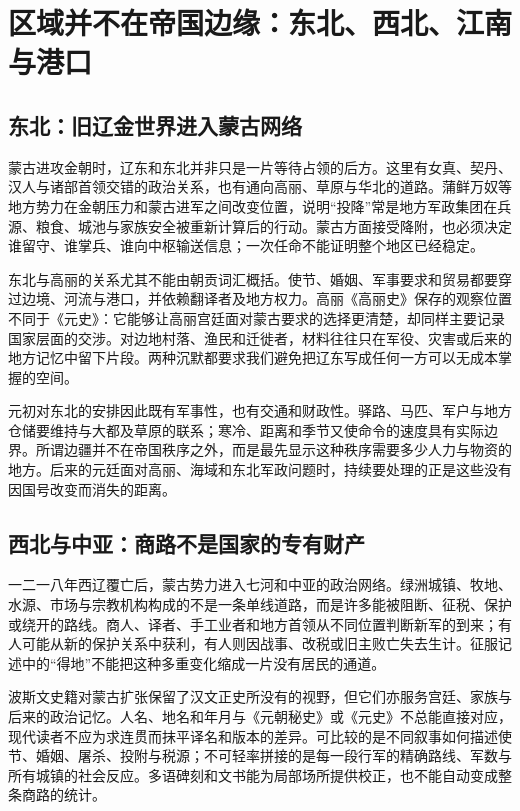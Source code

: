 \section{区域并不在帝国边缘：东北、西北、江南与港口}

\subsection{东北：旧辽金世界进入蒙古网络}

蒙古进攻金朝时，辽东和东北并非只是一片等待占领的后方。这里有女真、契丹、汉人与诸部首领交错的政治关系，也有通向高丽、草原与华北的道路。蒲鲜万奴等地方势力在金朝压力和蒙古进军之间改变位置，说明“投降”常是地方军政集团在兵源、粮食、城池与家族安全被重新计算后的行动。蒙古方面接受降附，也必须决定谁留守、谁掌兵、谁向中枢输送信息；一次任命不能证明整个地区已经稳定。

东北与高丽的关系尤其不能由朝贡词汇概括。使节、婚姻、军事要求和贸易都要穿过边境、河流与港口，并依赖翻译者及地方权力。高丽《高丽史》保存的观察位置不同于《元史》：它能够让高丽宫廷面对蒙古要求的选择更清楚，却同样主要记录国家层面的交涉。对边地村落、渔民和迁徙者，材料往往只在军役、灾害或后来的地方记忆中留下片段。两种沉默都要求我们避免把辽东写成任何一方可以无成本掌握的空间。

元初对东北的安排因此既有军事性，也有交通和财政性。驿路、马匹、军户与地方仓储要维持与大都及草原的联系；寒冷、距离和季节又使命令的速度具有实际边界。所谓边疆并不在帝国秩序之外，而是最先显示这种秩序需要多少人力与物资的地方。后来的元廷面对高丽、海域和东北军政问题时，持续要处理的正是这些没有因国号改变而消失的距离。

\subsection{西北与中亚：商路不是国家的专有财产}

一二一八年西辽覆亡后，蒙古势力进入七河和中亚的政治网络。绿洲城镇、牧地、水源、市场与宗教机构构成的不是一条单线道路，而是许多能被阻断、征税、保护或绕开的路线。商人、译者、手工业者和地方首领从不同位置判断新军的到来；有人可能从新的保护关系中获利，有人则因战事、改税或旧主败亡失去生计。征服记述中的“得地”不能把这种多重变化缩成一片没有居民的通道。

波斯文史籍对蒙古扩张保留了汉文正史所没有的视野，但它们亦服务宫廷、家族与后来的政治记忆。人名、地名和年月与《元朝秘史》或《元史》不总能直接对应，现代读者不应为求连贯而抹平译名和版本的差异。可比较的是不同叙事如何描述使节、婚姻、屠杀、投附与税源；不可轻率拼接的是每一段行军的精确路线、军数与所有城镇的社会反应。多语碑刻和文书能为局部场所提供校正，也不能自动变成整条商路的统计。

